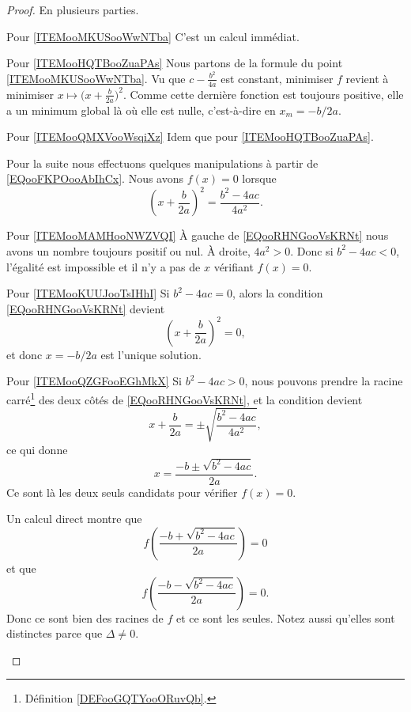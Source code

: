 \begin{proof}
	En plusieurs parties.
	\begin{subproof}
		\item[Pour \ref{ITEMooMKUSooWwNTba}]
		C'est un calcul immédiat.
		\item[Pour \ref{ITEMooHQTBooZuaPAs}]
		Nous partons de la formule du point \ref{ITEMooMKUSooWwNTba}. Vu que \( c-\frac{ b^2 }{ 4a }\) est constant, minimiser \( f\) revient à minimiser \( x\mapsto \big( x+\frac{ b }{ 2a } \big)^2\). Comme cette dernière fonction est toujours positive, elle a un minimum global là où elle est nulle, c'est-à-dire en \( x_m=-b/2a\).
		\item[Pour \ref{ITEMooQMXVooWsqiXz}]
		Idem que pour \ref{ITEMooHQTBooZuaPAs}.
	\end{subproof}
	Pour la suite nous effectuons quelques manipulations à partir de \eqref{EQooFKPOooAbIhCx}. Nous avons \( f(x)=0\) lorsque
	\begin{equation}        \label{EQooRHNGooVsKRNt}
		(x+\frac{ b }{ 2a })^2=\frac{ b^2-4ac }{ 4a^2 }.
	\end{equation}
	\begin{subproof}
		\item[Pour \ref{ITEMooMAMHooNWZVQI}]
		À gauche de \eqref{EQooRHNGooVsKRNt} nous avons un nombre toujours positif ou nul. À droite, \( 4a^2>0\). Donc si \( b^2-4ac<0\), l'égalité est impossible et il n'y a pas de \( x\) vérifiant \( f(x)=0\).
		\item[Pour \ref{ITEMooKUUJooTsIHhI}]
		Si \( b^2-4ac=0\), alors la condition \eqref{EQooRHNGooVsKRNt} devient
		\begin{equation}
			\left( x+\frac{ b }{ 2a } \right)^2=0,
		\end{equation}
		et donc \( x=-b/2a\) est l'unique solution.
		\item[Pour \ref{ITEMooQZGFooEGhMkX}]
		Si \( b^2-4ac>0\), nous pouvons prendre la racine carré\footnote{Définition \ref{DEFooGQTYooORuvQb}.} des deux côtés de \eqref{EQooRHNGooVsKRNt}, et la condition devient
		\begin{equation}
			x+\frac{ b }{ 2a }=\pm\sqrt{ \frac{ b^2-4ac }{ 4a^2 } },
		\end{equation}
		ce qui donne
		\begin{equation}
			x=\frac{ -b\pm\sqrt{ b^2-4ac } }{ 2a }.
		\end{equation}
		Ce sont là les deux seuls candidats pour vérifier \( f(x)=0\).

		Un calcul direct montre que
		\begin{equation}
			f\left( \frac{ -b+\sqrt{ b^2-4ac } }{ 2a } \right)=0
		\end{equation}
		et que
		\begin{equation}
			f\left( \frac{ -b-\sqrt{ b^2-4ac } }{ 2a } \right)=0.
		\end{equation}
		Donc ce sont bien des racines de \( f\) et ce sont les seules. Notez aussi qu'elles sont distinctes parce que \( \Delta\neq 0\).
	\end{subproof}
\end{proof}
